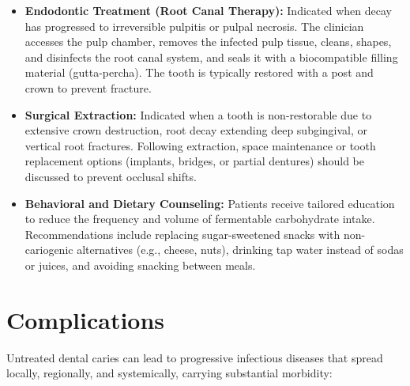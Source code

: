 \begin{itemize}
\begin{itemize}
\begin{itemize}
        \end{itemize}
        \item \textbf{Indirect Restorations:} Used when substantial tooth structure is lost. Inlays, onlays, and full-coverage crowns are fabricated from porcelain, zirconia, or gold alloys in a laboratory or using CAD/CAM systems, and cemented to the tooth.
    \end{itemize}
    \item \textbf{Endodontic Treatment (Root Canal Therapy):} Indicated when decay has progressed to irreversible pulpitis or pulpal necrosis. The clinician accesses the pulp chamber, removes the infected pulp tissue, cleans, shapes, and disinfects the root canal system, and seals it with a biocompatible filling material (gutta-percha). The tooth is typically restored with a post and crown to prevent fracture.
    \item \textbf{Surgical Extraction:} Indicated when a tooth is non-restorable due to extensive crown destruction, root decay extending deep subgingival, or vertical root fractures. Following extraction, space maintenance or tooth replacement options (implants, bridges, or partial dentures) should be discussed to prevent occlusal shifts.
    \item \textbf{Behavioral and Dietary Counseling:} Patients receive tailored education to reduce the frequency and volume of fermentable carbohydrate intake. Recommendations include replacing sugar-sweetened snacks with non-cariogenic alternatives (e.g., cheese, nuts), drinking tap water instead of sodas or juices, and avoiding snacking between meals.
\end{itemize}

\section*{Complications}
Untreated dental caries can lead to progressive infectious diseases that spread locally, regionally, and systemically, carrying substantial morbidity:

